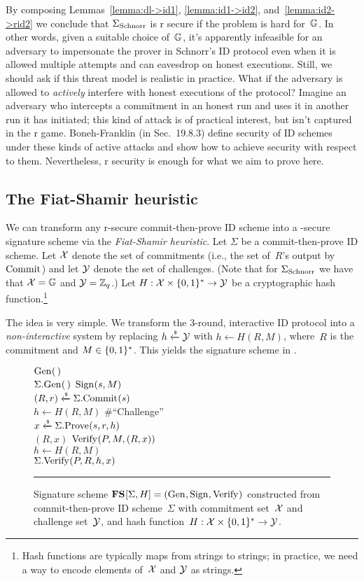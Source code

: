 \documentclass{article}
\newcounter{foot}
\theoremstyle{remark}
\begin{document}
By composing Lemmas~\ref{lemma:dl->id1}, \ref{lemma:id1->id2},
and~\ref{lemma:id2->rid2} we conclude that ${\Sigma_{\mathrm{Schnorr}}}$ is r secure if the \dl
problem is hard for~$\mathbb{G}$. In other words, given a suitable choice of~$\mathbb{G}$, it's
apparently infeasible for an adversary to impersonate the prover in Schnorr's ID
protocol even when it is allowed multiple attempts and can eavesdrop on honest
executions.
%
Still, we should ask if this threat model is realistic in practice. What if the
adversary is allowed to \emph{actively} interfere with honest executions of the
protocol? Imagine an adversary who intercepts a commitment in an honest run and
uses it in another run it has initiated; this kind of attack is of practical
interest, but isn't captured in the r game. Boneh-Franklin (in Sec.~19.8.3)
define security of ID schemes under these kinds of active attacks and show how
to achieve security with respect to them.
%
Nevertheless, r security is enough for what we aim to prove here.

\subsection{The Fiat-Shamir heuristic}
We can transform any r-secure commit-then-prove ID scheme into a
\ufcma-secure signature scheme via the \emph{Fiat-Shamir heuristic}.
%
Let $\Sigma$ be a commit-then-prove ID scheme. Let $\mathcal{X}$ denote the set of
commitments (i.e., the set of~$R$'s output by $\textnormal{Commit}\hspace{0.33pt}$) and let $\mathcal{Y}$ denote the
set of challenges.
%
(Note that for ${\Sigma_{\mathrm{Schnorr}}}$ we have that $\mathcal{X}=\mathbb{G}$ and $\mathcal{Y}=\mathbb{Z}_q$.)
%
Let $H:\mathcal{X}\times\{0,1\}^*\to\mathcal{Y}$ be a cryptographic hash function.\footnote{Hash
functions are typically maps from strings to strings; in practice, we need a way
to encode elements of~$\mathcal{X}$ and $\mathcal{Y}$ as strings.}

The idea is very simple. We transform the 3-round, interactive ID protocol into
a \emph{non-interactive} system by replacing $h \xleftarrow{\text{\tiny{\$}}} \mathcal{Y}$ with $h \gets H(R,
M)$, where~$R$ is the commitment and $M\in\{0,1\}^*$.
%
This yields the signature scheme in .

\begin{figure}[t]
  {\ga
    \fu $\textnormal{Gen}\hspace{0.33pt}(\,)$\\[2pt]
      \li \rreturn $\Sigma.\textnormal{Gen}\hspace{0.33pt}(\,)$
  }
  {
    \fu $\textnormal{Sign}\hspace{0.33pt}(s, M)$\\[2pt]
      \li $(R, r) \xleftarrow{\text{\tiny{\$}}} \Sigma.\textnormal{Commit}\hspace{0.33pt}(s)$\\
      \li $h \gets H(R,M)$ \#{``Challenge''}\\
      \li $x \xleftarrow{\text{\tiny{\$}}} \Sigma.\textnormal{Prove}\hspace{0.33pt}(s, r, h)$\\
      \li \rreturn $(R, x)$
  }
  {
    \fu $\textnormal{Verify}\hspace{0.33pt}(P, M, (R, x))$\\[2pt]
      \li $h \gets H(R, M)$\\
      \li \rreturn $\Sigma.\textnormal{Verify}\hspace{0.33pt}(P, R, h, x)$
  }
  \caption{Signature scheme $\textup{\textbf{FS}}\hspace{0.5pt}[\Sigma,H]=(\textnormal{Gen}\hspace{0.33pt},\textnormal{Sign}\hspace{0.33pt},\textnormal{Verify}\hspace{0.33pt})$ constructed from
  commit-then-prove ID scheme~$\Sigma$ with commitment set~$\mathcal{X}$ and challenge
  set~$\mathcal{Y}$, and hash function~$H:\mathcal{X}\times\{0,1\}^*\to\mathcal{Y}$.}
  \vspace{6pt}
  \hrule
  \label{fig:fs}
\end{figure}
\end{document}
